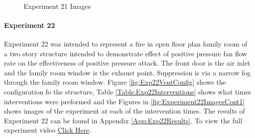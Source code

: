 \documentclass{article}
\begin{document}
\begin{figure}[H]
	\ContinuedFloat 
	\centering 
	 \ 
	\caption{Experiment 21 Images}
	\label{fig:Experiment21ImagesCont3} 
\end{figure}

\paragraph{Experiment 22}\mbox{}

Experiment 22 was intended to represent a fire in open floor plan family room of a two story structure intended to demonstrate effect of positive pressure fan flow rate on the effectiveness of positive pressure attack. The front door is the air inlet and the family room window is the exhaust point. Suppression is via a narrow fog through the family room window. Figure \ref{fig:Exp22VentConfig} shows the configuration fo the structure, Table \ref{Table:Exp22Interventions} shows what times interventions were preformed and the Figures in \ref{fig:Experiment22ImagesCont1} shows images of the experiment at each of the intervention times. The results of Experiment 22 can be found in Appendix \ref{App:Exp22Results}. To view the full experiment video \href{https://youtu.be/so4YGhws3SY}{Click Here}.
\end{document}
